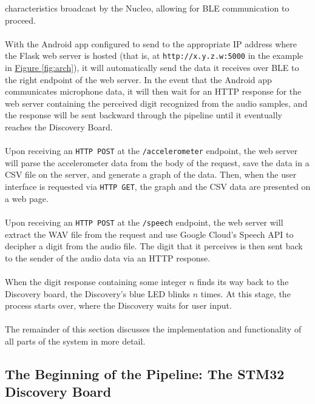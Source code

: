 characteristics broadcast by the Nucleo, allowing for BLE communication to proceed.\\\\
With the Android app configured to send to the appropriate IP address where the Flask web server is
hosted (that is, at \texttt{http://x.y.z.w:5000} in the example in \hyperref[fig:arch]{Figure \ref{fig:arch}}),
it will automatically send the data it receives over BLE to the right endpoint of the web server. In
the event that the Android app communicates microphone data, it will then wait for an HTTP response
for the web server containing the perceived digit recognized from the audio samples, and the
response will be sent backward through the pipeline until it eventually reaches the Discovery
Board.\\\\
Upon receiving an \texttt{HTTP POST} at the \texttt{/accelerometer} endpoint, the web server will
parse the accelerometer data from the body of the request, save the data in a CSV file on the
server, and generate a graph of the data. Then, when the user interface is requested via
\texttt{HTTP GET}, the graph and the CSV data are presented on a web page.\\\\
Upon receiving an \texttt{HTTP POST} at the \texttt{/speech} endpoint, the web server will extract
the WAV file from the request and use Google Cloud's Speech API to decipher a digit from the audio
file. The digit that it perceives is then sent back to the sender of the audio data via an HTTP
response.\\\\
When the digit response containing some integer $n$ finds its way back to the Discovery board, the
Discovery's blue LED blinks $n$ times. At this stage, the process starts over, where the Discovery
waits for user input.\\\\
The remainder of this section discusses the implementation and functionality of all parts of the
system in more detail.

\subsection{The Beginning of the Pipeline: The STM32 Discovery Board}


